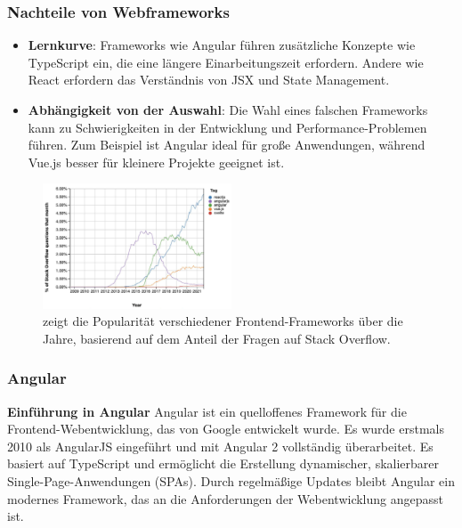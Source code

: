 \subsubsection{Nachteile von Webframeworks}
\begin{itemize}
	\item \textbf{Lernkurve}: Frameworks wie Angular führen zusätzliche Konzepte wie TypeScript ein, die eine längere Einarbeitungszeit erfordern. Andere wie React erfordern das Verständnis von JSX und State Management.\textit{\cite{awasthiresearch, rathinam2022analysis}}
	
	
	\item \textbf{Abhängigkeit von der Auswahl}: Die Wahl eines falschen Frameworks kann zu Schwierigkeiten in der Entwicklung und Performance-Problemen führen. Zum Beispiel ist Angular ideal für große Anwendungen, während Vue.js besser für kleinere Projekte geeignet ist.\textit{\cite{rathinam2022analysis}}
	
\end{itemize}

\begin{figure}
	\centering
	\includegraphics[width=0.5\textwidth]{images/framework_popularity.png}
	\caption{zeigt die Popularität verschiedener Frontend-Frameworks über die Jahre, basierend auf dem Anteil der Fragen auf Stack Overflow. \textit{\cite{akivab_js_framework}}}
\end{figure}



\subsubsection{Angular}

\textbf{Einführung in Angular}
\newline
Angular ist ein quelloffenes Framework für die Frontend-Webentwicklung, das von Google entwickelt wurde. Es wurde erstmals 2010 als AngularJS eingeführt und mit Angular 2 vollständig überarbeitet. Es basiert auf TypeScript und ermöglicht die Erstellung dynamischer, skalierbarer Single-Page-Anwendungen (SPAs). Durch regelmäßige Updates bleibt Angular ein modernes Framework, das an die Anforderungen der Webentwicklung angepasst ist.\textit{\cite{madurapperuma2022state, shetty2020review, angular}} \newline


